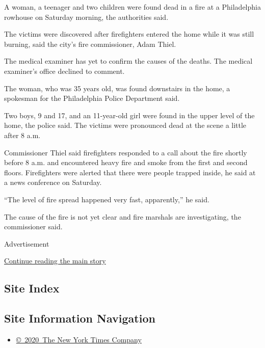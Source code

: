 A woman, a teenager and two children were found dead in a fire at a
Philadelphia rowhouse on Saturday morning, the authorities said.

The victims were discovered after firefighters entered the home while it
was still burning, said the city's fire commissioner, Adam Thiel.

The medical examiner has yet to confirm the causes of the deaths. The
medical examiner's office declined to comment.

The woman, who was 35 years old, was found downstairs in the home, a
spokesman for the Philadelphia Police Department said.

Two boys, 9 and 17, and an 11-year-old girl were found in the upper
level of the home, the police said. The victims were pronounced dead at
the scene a little after 8 a.m.

Commissioner Thiel said firefighters responded to a call about the fire
shortly before 8 a.m. and encountered heavy fire and smoke from the
first and second floors. Firefighters were alerted that there were
people trapped inside, he said at a news conference on Saturday.

``The level of fire spread happened very fast, apparently,'' he said.

The cause of the fire is not yet clear and fire marshals are
investigating, the commissioner said.

Advertisement

\protect\hyperlink{after-bottom}{Continue reading the main story}

\hypertarget{site-index}{%
\subsection{Site Index}\label{site-index}}

\hypertarget{site-information-navigation}{%
\subsection{Site Information
Navigation}\label{site-information-navigation}}

\begin{itemize}
\tightlist
\item
  \href{https://help.nytimes3xbfgragh.onion/hc/en-us/articles/115014792127-Copyright-notice}{©~2020~The
  New York Times Company}
\end{itemize}

